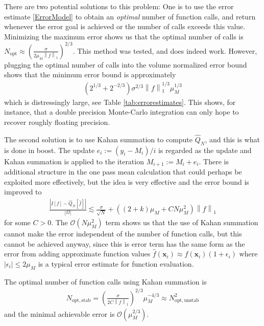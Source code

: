 \documentclass{ansarticle}
\begin{document}
There are two potential solutions to this problem: One is to use the error estimate \ref{ErrorModel} to obtain an \emph{optimal} number of function calls, and return whenever the error goal is achieved or the number of calls exceeds this value.
Minimizing the maximum error shows us that the optimal number of calls is $N_{\mathrm{opt}} \approx \left( \frac{\sigma}{2\mu_{M}\left\|f\right\|_{1}}\right)^{2/3}$.
This method was tested, and does indeed work.
However, plugging the optimal number of calls into the volume normalized error bound shows that the minimum error bound is approximately
\begin{align*}
(2^{1/3}+2^{-2/3})\sigma^{2/3}\left\|f\right\|_{1}^{1/3} \mu_{M}^{1/3}
\end{align*}
which is distressingly large, see Table \ref{tab:errorestimates}.
This shows, for instance, that a double precision Monte-Carlo integration can only hope to recover roughly floating precision.

The second solution is to use Kahan summation to compute $\hat{Q}_{N}$, and this is what is done in boost.
The update $e_{i} := (y_{i} - M_{i})/i$ is regarded as the update and Kahan summation is applied to the iteration $M_{i+1} := M_{i} + e_{i}$.
There is additional structure in the one pass mean calculation that could perhaps be exploited more effectively, but the idea is very effective and the error bound is improved to
\begin{align}\label{KahanError}
\frac{\left| I[f] - \hat{Q}_{N}[\hat{f}] \right|}{|\Omega|} \lesssim \frac{\sigma}{\sqrt{N}} + ((2+k)\mu_{M} + CN\mu_{M}^2)\left\|f\right\|_{1}
\end{align}
for some $C > 0$.
The $\mathcal{O}(N\mu_{M}^2)$ term shows us that the use of Kahan summation cannot make the error independent of the number of function calls, but this cannot be achieved anyway, since this is error term has the same form as the error from adding approximate function values $\hat{f}(\mathbf{x}_{i}) \approx f(\mathbf{x}_{i})(1+\epsilon_{i})$ where $|\epsilon_{i}| \le 2\mu_{M}$ is a typical error estimate for function evaluation.

The optimal number of function calls using Kahan summation is
\begin{align*}
N_{\mathrm{opt, stab}} = \left( \frac{\sigma}{2C\left\|f\right\|_{1} }\right)^{2/3}  \mu_{M}^{-4/3} \approx N_{\mathrm{opt,unstab}}^{2}
\end{align*}
and the minimal achievable error is $\mathcal{O}(\mu_{M}^{2/3})$.
\end{document}
